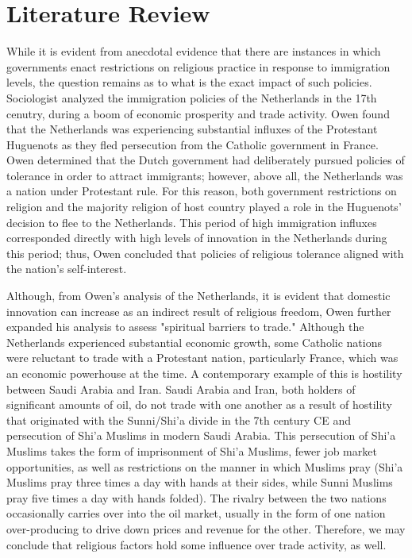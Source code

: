 \documentclass[12pt,english]{article}
\begin{document}
\section{Literature Review}
While it is evident from anecdotal evidence that there are instances in which governments enact restrictions on religious practice in response to immigration levels, the question remains as to what is the exact impact of such policies. Sociologist \citet{Owen} analyzed the immigration policies of the Netherlands in the 17th cenutry, during a boom of economic prosperity and trade activity. Owen found that the Netherlands was experiencing substantial influxes of the Protestant Huguenots as they fled persecution from the Catholic government in France. Owen determined that the Dutch government had deliberately pursued policies of tolerance in order to attract immigrants; however, above all, the Netherlands was a nation under Protestant rule. For this reason, both government restrictions on religion and the majority religion of host country played a role in the Huguenots' decision to flee to the Netherlands. This period of high immigration influxes corresponded directly with high levels of innovation in the Netherlands during this period; thus, Owen concluded that policies of religious tolerance aligned with the nation's self-interest.

Although, from Owen's analysis of the Netherlands, it is evident that domestic innovation can increase as an indirect result of religious freedom, Owen further expanded his analysis to assess "spiritual barriers to trade." Although the Netherlands experienced substantial economic growth, some Catholic nations were reluctant to trade with a Protestant nation, particularly France, which was an economic powerhouse at the time. A contemporary example of this is hostility between Saudi Arabia and Iran. Saudi Arabia and Iran, both holders of significant amounts of oil, do not trade with one another as a result of hostility that originated with the Sunni/Shi'a divide in the 7th century CE and persecution of Shi'a Muslims in modern Saudi Arabia. This persecution of Shi'a Muslims takes the form of imprisonment of Shi'a Muslims, fewer job market opportunities, as well as restrictions on the manner in which Muslims pray (Shi'a Muslims pray three times a day with hands at their sides, while Sunni Muslims pray five times a day with hands folded). The rivalry between the two nations occasionally carries over into the oil market, usually in the form of one nation over-producing to drive down prices and revenue for the other. Therefore, we may conclude that religious factors hold some influence over trade activity, as well.
\end{document}
